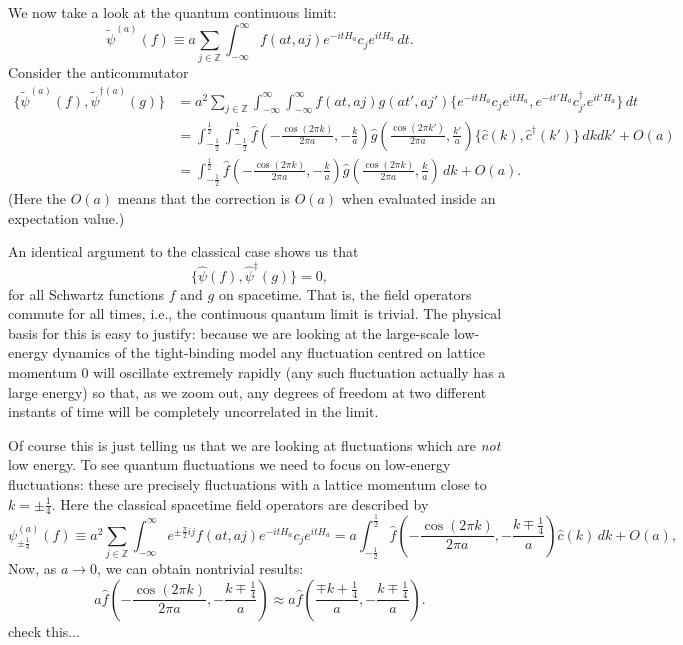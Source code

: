 \documentclass[prl,twocolumn,lengthcheck,superscriptaddress]{revtex4-1}
\theoremstyle{definition}
\theoremstyle{remark}
\begin{document}
We now take a look at the quantum continuous limit:
\begin{equation}
	\widetilde{\psi}^{(a)}(f) \equiv a\sum_{j\in\mathbb{Z}} \int_{-\infty}^\infty f(at, aj) e^{-itH_a}c_j e^{itH_a} \, dt.
\end{equation}
Consider the anticommutator
\begin{equation}
	\begin{split}
		\{\widetilde{\psi}^{(a)}(f), {\widetilde{\psi}^{\dag (a)}}(g)\} &= a^2\sum_{j\in\mathbb{Z}} \int_{-\infty}^\infty \int_{-\infty}^\infty f(at, aj)g(at', aj') \{e^{-itH_a}c_j e^{itH_a},  e^{-it'H_a}c_{j'}^\dag e^{it'H_a}\} \, dt \\
		&= \int_{-\frac12}^{\frac12}\int_{-\frac12}^{\frac12}\widehat{f}\left(-\frac{\cos(2\pi k)}{2\pi a}, -\frac{k}{a}\right)\widehat{g}\left(\frac{\cos(2\pi k')}{2\pi a}, \frac{k'}{a}\right) \{\widehat{c}(k), \widehat{c}^\dag(k') \}\, dkdk' + O(a) \\
		&= \int_{-\frac12}^{\frac12}\widehat{f}\left(-\frac{\cos(2\pi k)}{2\pi a}, -\frac{k}{a}\right)\widehat{g}\left(\frac{\cos(2\pi k)}{2\pi a}, \frac{k}{a}\right) \, dk + O(a).
	\end{split}
\end{equation}
(Here the $O(a)$ means that the correction is $O(a)$ when evaluated inside an expectation value.)


An identical argument to the classical case shows us that
\begin{equation}
	\{\widehat{\psi}(f), \widehat{\psi}^\dag(g)\} = 0,
\end{equation}
for all Schwartz functions $f$ and $g$ on spacetime. That is, the field operators commute for all times, i.e., the continuous quantum limit is trivial. The physical basis for this is easy to justify: because we are looking at the large-scale low-energy dynamics of the tight-binding model any fluctuation centred on lattice momentum $0$ will oscillate extremely rapidly (any such fluctuation actually has a large energy) so that, as we zoom out, any degrees of freedom at two different instants of time will be completely uncorrelated in the limit. 

Of course this is just telling us that we are looking at fluctuations which are \emph{not} low energy. To see quantum fluctuations we need to focus on low-energy fluctuations: these are precisely fluctuations with a lattice momentum close to $k=\pm \frac14$. Here the classical spacetime field operators are described by
\begin{equation}
	\psi^{(a)}_{\pm\frac{1}{4}}(f) \equiv a^2\sum_{j\in\mathbb{Z}}\int_{-\infty}^{\infty} e^{\pm\frac{\pi}{2} i j}f(at,aj) e^{-itH_a}c_j e^{itH_a} = a\int_{-\frac12}^{\frac12}\widehat{f}\left(-\frac{\cos(2\pi k)}{2\pi a}, -\frac{k\mp \frac14}{a}\right) \widehat{c}(k)\, dk + O(a),
\end{equation}
Now, as $a\rightarrow 0$, we can obtain nontrivial results:
\begin{equation}
	a\widehat{f}\left(-\frac{\cos(2\pi k)}{2\pi a}, -\frac{k\mp \frac14}{a}\right) \approx a \widehat{f}\left(\frac{\mp k+\frac14}{a}, -\frac{k\mp \frac14}{a}\right).
\end{equation}
{\color{red} check this...}
\end{document}
